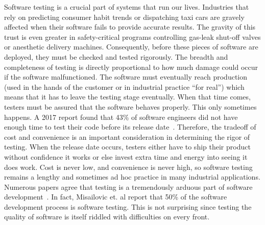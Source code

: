 
Software testing is a crucial part of systems that run our lives. Industries that rely on predicting consumer habit trends or dispatching taxi cars are gravely affected when their software fails to provide accurate results. The gravity of this trust is even greater in safety-critical programs controlling gas-leak shut-off valves or anesthetic delivery machines. Consequently, before these pieces of software are deployed, they must be checked and tested rigorously. The breadth and completeness of testing is directly proportional to how much damage could occur if the software malfunctioned. The software must eventually reach production (used in the hands of the customer or in industrial practice ``for real'') which means that it has to leave the testing stage eventually. When that time comes, testers must be assured that the software behaves properly. This only sometimes happens. A 2017 report found that 43\% of software engineers did not have enough time to test their code before its release date~\cite{Kassab-deFranco-Laplante}. Therefore, the tradeoff of cost and convenience is an important consideration in determining the rigor of testing. When the release date occurs, testers either have to ship their product without confidence it works or else invest extra time and energy into seeing it does work. Cost is never low, and convenience is never high, so software testing remains a lengthy and sometimes ad hoc practice in many industrial applications. Numerous papers agree that  testing is a tremendously arduous part of software development~\cite{Murphy:2007:PRT:1292414.1292425,Haller:2010:TDC:1838126.1838132,Muslu:2015:PDE:2771783.2771792,Tiwari:2013:RRT:2439976.2439982,Gupta:2011:MBA:2002931.2002932,Zeller:2017:STS:3105427.3105438,Garousi:2017:IWA:3084226.3084264,Kassab-deFranco-Laplante,Langdon:2017:IAT:3105427.3105429,Goffi:2016:AGO:2931037.2931061}. In fact, Misailovic et. al report that 50\% of the software development process is software testing. This is not surprising since testing the quality of software is itself riddled with difficulties on every front.

